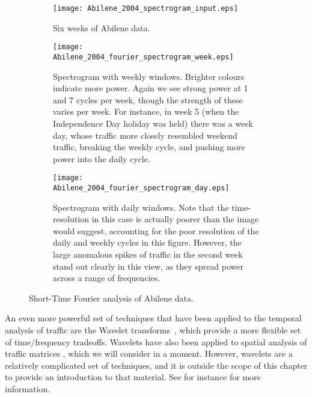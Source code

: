 \begin{figure}[thbp] 
  \begin{center}
    \begin{subfigure}[b]{\oneup}
      \centering
      \texttt{[image: Abilene\_2004\_spectrogram\_input.eps]}
       \vspace{-9mm}
     \caption{Six weeks of Abilene data.}
      \label{fig:spectrogam_a} 
    \end{subfigure}  

      \vspace{5mm}
    \begin{subfigure}[b]{\oneup}
      \centering
      \texttt{[image: Abilene\_2004\_fourier\_spectrogram\_week.eps]}
       \vspace{-5mm}
       \caption{Spectrogram with weekly windows. Brighter colours
         indicate more power. Again we see strong power at 1 and 7
         cycles per week, though the strength of these varies per
         week. For instance, in week 5 (when the Independence Day
         holiday was held) there was a week day, whose traffic more
         closely resembled weekend traffic, breaking the weekly cycle,
         and pushing more power into the daily cycle.}
      \label{fig:spectrogam_b} 
    \end{subfigure}  

      \vspace{5mm}
    \begin{subfigure}[b]{\oneup}
      \centering
      \texttt{[image: Abilene\_2004\_fourier\_spectrogram\_day.eps]}
      \vspace{-5mm}
      \caption{Spectrogram with daily windows. Note that the
        time-resolution in this case is actually poorer than the image
      would suggest, accounting for the poor resolution of the daily
      and weekly cycles in this figure. However, the large anomalous
      spikes of traffic in the second week stand out clearly in this
      view, as they spread power across a range of frequencies.}
      \label{fig:spectrogam_c}
    \end{subfigure}  
   
    \caption{Short-Time Fourier analysis of Abilene data.\label{fig:spectrogam}}
  \end{center}
\end{figure}         

An even more powerful set of techniques that have been applied to the
temporal analysis of traffic are the Wavelet
transforms~\cite{Veitch97Wavelet,Barford02Anomaly,Papagiannaki05Long},
which provide a more flexible set of time/frequency
tradeoffs. Wavelets have also been applied to spatial analysis of
traffic matrices 
\cite{CrovellaKolaczyk03,CoatesCompressedNetworkMonitoring,wang10:_wavel_based_traff_matrix_model,rincon08:_dw,roughan_mra_09},
which we will consider in a moment.  However, wavelets are a
relatively complicated set of techniques, and it is outside the scope
of this chapter to provide an introduction to that material. See for
instance \cite{mallet:_book} for more information. 

